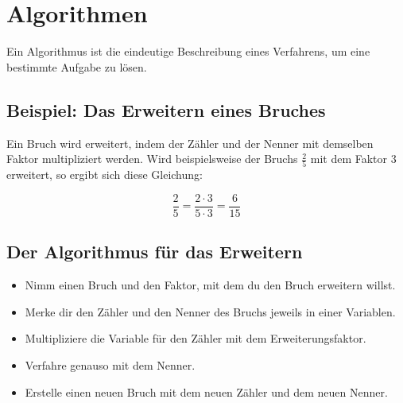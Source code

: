 \section{Algorithmen}
\label{sec:Algorithmus}

Ein Algorithmus ist die eindeutige Beschreibung eines Verfahrens, um eine bestimmte Aufgabe zu lösen.

\subsection{Beispiel: Das Erweitern eines Bruches}

Ein Bruch wird erweitert, indem der Zähler und der Nenner mit demselben Faktor multipliziert werden. Wird beispielsweise der Bruchs $\frac{2}{5}$ mit dem Faktor $3$ erweitert, so ergibt sich diese Gleichung:

\[
\frac{2}{5} = \frac{2 \cdot 3}{5 \cdot 3} = \frac{6}{15}
\]

\subsection{Der Algorithmus für das Erweitern}

\begin{itemize}
	\item Nimm einen Bruch und den Faktor, mit dem du den Bruch erweitern willst.
	\item Merke dir den Zähler und den Nenner des Bruchs jeweils in einer Variablen.
	\item Multipliziere die Variable für den Zähler mit dem Erweiterungsfaktor.
	\item Verfahre genauso mit dem Nenner.
	\item Erstelle einen neuen Bruch mit dem neuen Zähler und dem neuen Nenner.
\end{itemize}